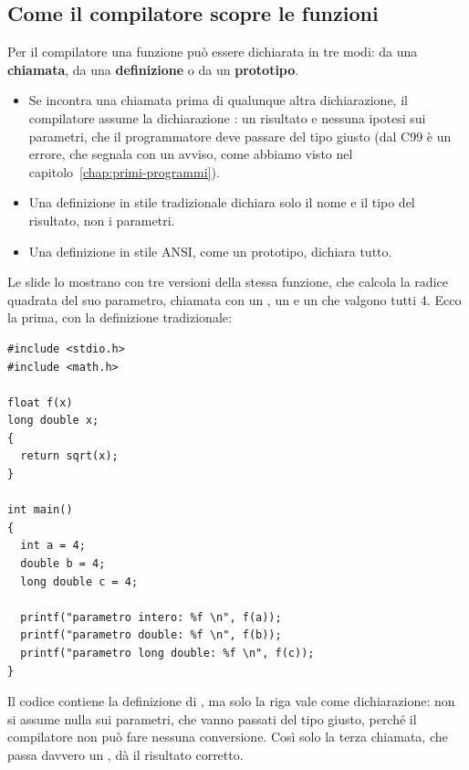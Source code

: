 \subsection{Come il compilatore scopre le funzioni}

Per il compilatore una funzione può essere dichiarata in tre modi: da una
\textbf{chiamata}, da una \textbf{definizione} o da un \textbf{prototipo}.

\begin{itemize}
  \item Se incontra una chiamata  prima di qualunque altra
        dichiarazione, il compilatore assume la dichiarazione
        : un risultato  e nessuna ipotesi sui
        parametri, che il programmatore deve passare del tipo giusto (dal
        C99 è un errore, che  segnala con un avviso, come abbiamo
        visto nel capitolo~\ref{chap:primi-programmi}).
  \item Una definizione in stile tradizionale dichiara solo il nome e il tipo
        del risultato, non i parametri.
  \item Una definizione in stile ANSI, come un prototipo, dichiara tutto.
\end{itemize}

Le slide lo mostrano con tre versioni della stessa funzione, che calcola la
radice quadrata del suo parametro, chiamata con un , un
 e un  che valgono tutti 4. Ecco la prima,
con la definizione tradizionale:

\begin{affianco}[0.5][c]
\begin{lstlisting}[style=c, name=kr1.c]
#include <stdio.h>
#include <math.h>

float f(x)
long double x;
{
  return sqrt(x);
}

int main()
{
  int a = 4;
  double b = 4;
  long double c = 4;

  printf("parametro intero: %f \n", f(a));
  printf("parametro double: %f \n", f(b));
  printf("parametro long double: %f \n", f(c));
}
\end{lstlisting}
\risultato
{}
\end{affianco}

Il codice contiene la definizione di , ma solo la riga
 vale come dichiarazione: non si assume nulla sui
parametri, che vanno passati del tipo giusto, perché il compilatore non può
fare nessuna conversione. Così solo la terza chiamata, che passa davvero un
, dà il risultato corretto.

